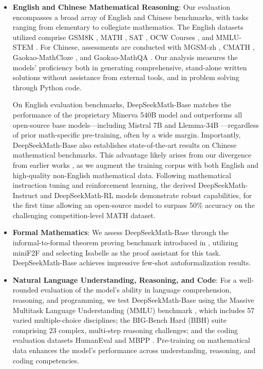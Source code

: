 \begin{itemize}[topsep=0pt]
    \item \textbf{English and Chinese Mathematical Reasoning}: Our evaluation encompasses a broad array of English and Chinese benchmarks, with tasks ranging from elementary to collegiate mathematics. The English datasets utilized comprise GSM8K \citep{gsm8k}, MATH \citep{MATH}, SAT \citep{llemma}, OCW Courses \citep{minerva}, and MMLU-STEM \citep{mmlu}. For Chinese, assessments are conducted with MGSM-zh \citep{mgsm}, CMATH \citep{wei2023cmath}, Gaokao-MathCloze \citep{agieval}, and Gaokao-MathQA \citep{agieval}. Our analysis measures the models' proficiency both in generating comprehensive, stand-alone written solutions without assistance from external tools, and in problem solving through Python code.

On English evaluation benchmarks, DeepSeekMath-Base matches the performance of the proprietary Minerva 540B model \citep{minerva} and outperforms all open-source base models—including Mistral 7B \citep{mistral} and Llemma-34B \citep{llemma}—regardless of prior math-specific pre-training, often by a wide margin. Importantly, DeepSeekMath-Base also establishes state-of-the-art results on Chinese mathematical benchmarks. This advantage likely arises from our divergence from earlier works \citep{minerva,llemma}, as we augment the training corpus with both English and high-quality non-English mathematical data. Following mathematical instruction tuning and reinforcement learning, the derived DeepSeekMath-Instruct and DeepSeekMath-RL models demonstrate robust capabilities, for the first time allowing an open-source model to surpass 50\% accuracy on the challenging competition-level MATH dataset.

\item \textbf{Formal Mathematics}: We assess DeepSeekMath-Base through the informal-to-formal theorem proving benchmark introduced in \citep{dsp_proof}, utilizing miniF2F \citep{minif2f} and selecting Isabelle \citep{isabelle} as the proof assistant for this task. DeepSeekMath-Base achieves impressive few-shot autoformalization results.
\item \textbf{Natural Language Understanding, Reasoning, and Code}: For a well-rounded evaluation of the model’s ability in language comprehension, reasoning, and programming, we test DeepSeekMath-Base using the Massive Multitask Language Understanding (MMLU) benchmark \citep{mmlu}, which includes 57 varied multiple-choice disciplines; the BIG-Bench Hard (BBH) suite \citep{bbh} comprising 23 complex, multi-step reasoning challenges; and the coding evaluation datasets HumanEval \citep{codex} and MBPP \citep{mbpp}. Pre-training on mathematical data enhances the model’s performance across understanding, reasoning, and coding competencies.


\end{itemize}
